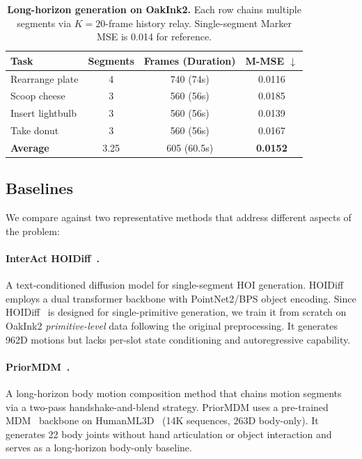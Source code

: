 \documentclass[sigconf, screen, review, anonymous]{acmart}
\begin{document}
\begin{table}[t]
  \caption{\textbf{Long-horizon generation on OakInk2.} Each row chains multiple segments via $K{=}20$-frame history relay. Single-segment Marker MSE is 0.014 for reference.}
  \label{tab:long_horizon}
  \centering
  \small
  \begin{tabular}{@{}lccc@{}}
    \toprule
    Task & Segments & Frames (Duration) & M-MSE $\downarrow$ \\
    \midrule
    Rearrange plate & 4 & 740 (74s) & 0.0116 \\
    Scoop cheese  & 3 & 560 (56s) & 0.0185 \\
    Insert lightbulb & 3 & 560 (56s) & 0.0139 \\
    Take donut & 3 & 560 (56s) & 0.0167 \\
    \midrule
    \textbf{Average} & 3.25 & 605 (60.5s) & \textbf{0.0152} \\
    \bottomrule
  \end{tabular}
\end{table}



\subsection{Baselines}
\label{sec:baselines}

We compare against two representative methods that address different aspects of the problem:

\paragraph{InterAct HOIDiff~\cite{xu2025interact}.}
A text-conditioned diffusion model for single-segment HOI generation.
HOIDiff employs a dual transformer backbone with PointNet2/BPS object encoding.
Since HOIDiff~\cite{2025_hoidiff} is designed for single-primitive generation, we train it from scratch on OakInk2 \emph{primitive-level} data following the original preprocessing.
It generates 962D motions but lacks per-slot state conditioning and autoregressive capability.

\paragraph{PriorMDM~\cite{shafir2024priormdm}.}
A long-horizon body motion composition method that chains motion segments via a two-pass handshake-and-blend strategy.
PriorMDM uses a pre-trained MDM~\cite{tevet2023human} backbone on HumanML3D~\cite{guo2022generating} (14K sequences, 263D body-only).
It generates 22 body joints without hand articulation or object interaction and serves as a long-horizon body-only baseline.
\end{document}
